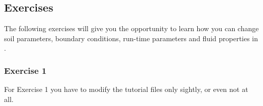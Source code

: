 \subsection{Exercises}
\label{tutorial-coupled:exercises}

The following exercises will give you the opportunity to learn how you
can change soil parameters, boundary conditions, run-time parameters
and fluid properties in \eWoms.

\subsubsection{Exercise 1}

\renewcommand{\labelenumi}{\alph{enumi})}

For Exercise 1 you have to modify the tutorial files only sightly, or
even not at all.

